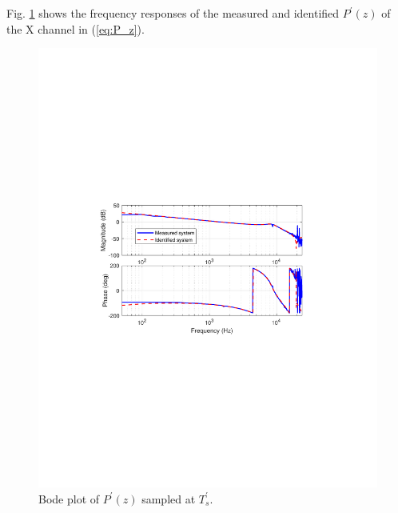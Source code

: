 \documentclass [11pt, proquest] {uwthesis}[2020/02/24]
\begin{document}
Fig. \ref{fig:Bode-plot-of} shows the frequency responses of the
measured and identified $P^{'}(z)$ of the X channel in (\ref{eq:P_z}).
\begin{figure}[!ht]
\begin{centering}
\includegraphics[width=12cm]{Fractional-order-RC/bode_plant}
\par\end{centering}
\caption{\label{fig:Bode-plot-of}Bode plot of $P^{'}(z)$ sampled at $T_{s}^{'}$.}
\end{figure}
\end{document}
